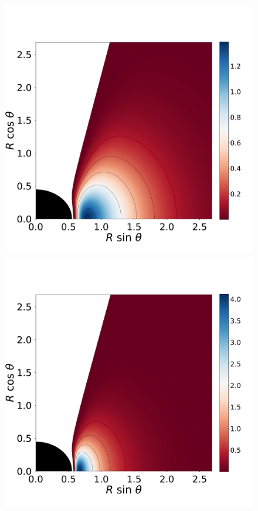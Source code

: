 \documentclass[twocolumn,aps,showpacs,showkeys,prd,superscriptaddress,byrevtex, amsmath]{revtex4-1}
\begin{document}
\begin{figure}
\hspace{-0.3cm}
\includegraphics[scale=0.14]{figures/fig4_VI_1.pdf}
\hspace{-0.2cm}
\includegraphics[scale=0.14]{figures/fig4_VI__10.pdf}

\end{figure}
\end{document}
